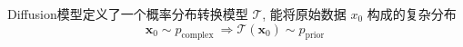 \documentclass[]{ctexart}
\begin{document}
Diffusion模型定义了一个概率分布转换模型 $\mathcal{T}$, 能将原始数据 $x_0$ 构成的复杂分布
$$
\mathbf{x}_0 \sim p_{\text {complex }} \Longrightarrow \mathcal{T}\left(\mathbf{x}_0\right) \sim p_{\text {prior }}
$$
\end{document}
